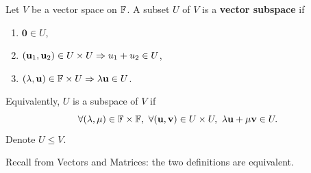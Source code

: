 \documentclass[a4paper]{article}
\begin{document}
\begin{definition}[Subspace]
    Let $V$ be a vector space on ${\mathbb{F}}$. A subset $U$ of $V$ is a \textbf{vector subspace} if 
    \begin{enumerate}
        \item $ \mathbf{0}\in U $,
        \item $ ({\bf u}_1,{\bf u}_2)\in U\times U \Rightarrow u_1+u_2\in U $,
        \item $ (\lambda,{\bf u})\in {\mathbb{F}}\times U \Rightarrow \lambda{\bf u}\in U $.
    \end{enumerate}
    Equivalently, $U$ is a subspace of $V$ if 
    \[
        \forall (\lambda,\mu)\in {\mathbb{F}}\times {\mathbb{F}},\ \forall ({\bf u},{\bf v})\in U\times U,\ \lambda{\bf u}+\mu{\bf v}\in U.
    \]
    Denote $ U\le V $.
\end{definition}
Recall from Vectors and Matrices: the two definitions are equivalent.
\end{document}
